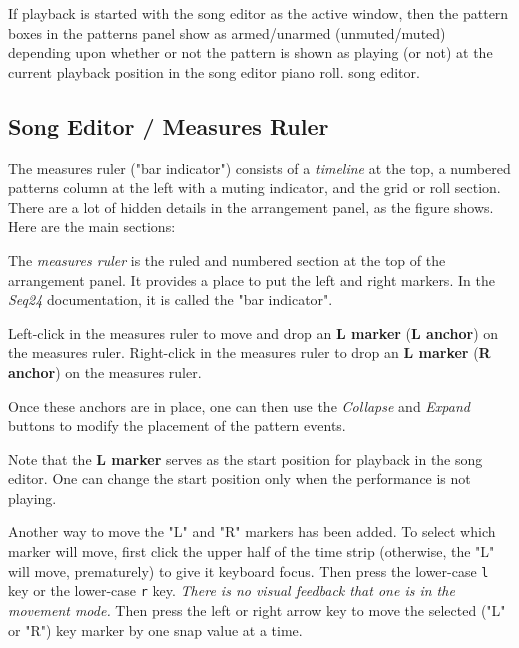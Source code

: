    If playback is started with the song editor as the
   active window, then the pattern boxes in the patterns panel
   show as armed/unarmed (unmuted/muted) depending upon whether or not the
   pattern is shown as playing (or not) at the current playback position in
   the song editor piano roll.
   song editor.

\subsection{Song Editor / Measures Ruler}
\label{subsec:song_editor_measures_ruler}

   The measures ruler ("bar indicator")
   consists of a \textsl{timeline} at the top, a
   numbered patterns column at the left with a muting indicator, and the
   grid or roll section.  There are a lot of hidden details in the
   arrangement panel, as the figure shows.  Here are the main sections:

   The \textsl{measures ruler} is the ruled and numbered section at the top
   of the arrangement panel.  It provides a place to put the left and right
   markers.  In the \textsl{Seq24} documentation, it is called the "bar
   indicator".

   Left-click in the measures ruler to move and drop an
   \textbf{L marker} (\textbf{L anchor}) on the measures ruler.
   Right-click in the measures ruler to drop an
   \textbf{L marker} (\textbf{R anchor}) on the measures ruler.

   Once these anchors are in place, one can then use
	the \textsl{Collapse} and \textsl{Expand} buttons to modify the
   placement of the pattern events.

   Note that the \textbf{L marker} serves as the start position for playback
   in the song editor.  One can change the start position only when the
   performance is not playing.

   Another way to move the "L" and "R" markers has been added.
   To select which marker will move, first click the upper half of the time
   strip (otherwise, the "L" will move, prematurely) to give it keyboard focus.
   Then press the lower-case
   \texttt{l} key or the lower-case
   \texttt{r} key.
   \textsl{There is no visual feedback that one is in the movement mode.}
   Then press the left or right arrow key to move the selected ("L" or "R")
   key marker by one snap value at a time.

